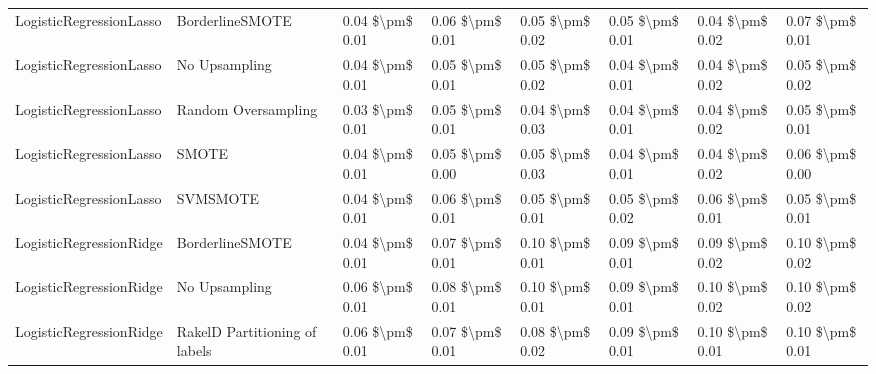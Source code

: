 \begin{tabular}{llllllll}
        LogisticRegressionLasso &               BorderlineSMOTE & 0.04 \$\textbackslash pm\$ 0.01 &           0.06 \$\textbackslash pm\$ 0.01 &       0.05 \$\textbackslash pm\$ 0.02 &        0.05 \$\textbackslash pm\$ 0.01 &                         0.04 \$\textbackslash pm\$ 0.02 & 0.07 \$\textbackslash pm\$ 0.01 \\
        LogisticRegressionLasso &                 No Upsampling & 0.04 \$\textbackslash pm\$ 0.01 &           0.05 \$\textbackslash pm\$ 0.01 &       0.05 \$\textbackslash pm\$ 0.02 &        0.04 \$\textbackslash pm\$ 0.01 &                         0.04 \$\textbackslash pm\$ 0.02 & 0.05 \$\textbackslash pm\$ 0.02 \\
        LogisticRegressionLasso &           Random Oversampling & 0.03 \$\textbackslash pm\$ 0.01 &           0.05 \$\textbackslash pm\$ 0.01 &       0.04 \$\textbackslash pm\$ 0.03 &        0.04 \$\textbackslash pm\$ 0.01 &                         0.04 \$\textbackslash pm\$ 0.02 & 0.05 \$\textbackslash pm\$ 0.01 \\
        LogisticRegressionLasso &                         SMOTE & 0.04 \$\textbackslash pm\$ 0.01 &           0.05 \$\textbackslash pm\$ 0.00 &       0.05 \$\textbackslash pm\$ 0.03 &        0.04 \$\textbackslash pm\$ 0.01 &                         0.04 \$\textbackslash pm\$ 0.02 & 0.06 \$\textbackslash pm\$ 0.00 \\
        LogisticRegressionLasso &                      SVMSMOTE & 0.04 \$\textbackslash pm\$ 0.01 &           0.06 \$\textbackslash pm\$ 0.01 &       0.05 \$\textbackslash pm\$ 0.01 &        0.05 \$\textbackslash pm\$ 0.02 &                         0.06 \$\textbackslash pm\$ 0.01 & 0.05 \$\textbackslash pm\$ 0.01 \\
        LogisticRegressionRidge &               BorderlineSMOTE & 0.04 \$\textbackslash pm\$ 0.01 &           0.07 \$\textbackslash pm\$ 0.01 &       0.10 \$\textbackslash pm\$ 0.01 &        0.09 \$\textbackslash pm\$ 0.01 &                         0.09 \$\textbackslash pm\$ 0.02 & 0.10 \$\textbackslash pm\$ 0.02 \\
        LogisticRegressionRidge &                 No Upsampling & 0.06 \$\textbackslash pm\$ 0.01 &           0.08 \$\textbackslash pm\$ 0.01 &       0.10 \$\textbackslash pm\$ 0.01 &        0.09 \$\textbackslash pm\$ 0.01 &                         0.10 \$\textbackslash pm\$ 0.02 & 0.10 \$\textbackslash pm\$ 0.02 \\
        LogisticRegressionRidge & RakelD Partitioning of labels & 0.06 \$\textbackslash pm\$ 0.01 &           0.07 \$\textbackslash pm\$ 0.01 &       0.08 \$\textbackslash pm\$ 0.02 &        0.09 \$\textbackslash pm\$ 0.01 &                         0.10 \$\textbackslash pm\$ 0.01 & 0.10 \$\textbackslash pm\$ 0.01 \\

\end{tabular}
